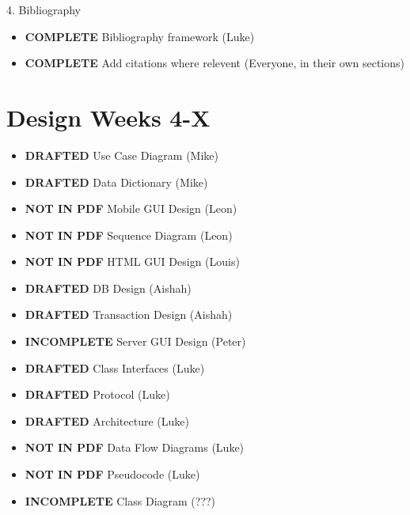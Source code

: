4. Bibliography
\begin{itemize}
\item \textbf{COMPLETE} Bibliography framework (Luke)
\item \textbf{COMPLETE} Add citations where relevent (Everyone, in their own sections)
\end{itemize}

\section{Design \textbf{Weeks 4-X}}
\begin{itemize}
\item \textbf{DRAFTED}       Use Case Diagram (Mike)
\item \textbf{DRAFTED}       Data Dictionary (Mike)
\item \textbf{NOT IN PDF}    Mobile GUI Design (Leon)
\item \textbf{NOT IN PDF}    Sequence Diagram (Leon)
\item \textbf{NOT IN PDF}    HTML GUI Design (Louis)
\item \textbf{DRAFTED}       DB Design (Aishah)
\item \textbf{DRAFTED}       Transaction Design (Aishah)
\item \textbf{INCOMPLETE}    Server GUI Design (Peter)
\item \textbf{DRAFTED}       Class Interfaces (Luke)
\item \textbf{DRAFTED}       Protocol (Luke)
\item \textbf{DRAFTED}       Architecture (Luke)
\item \textbf{NOT IN PDF}    Data Flow Diagrams (Luke)
\item \textbf{NOT IN PDF}    Pseudocode (Luke)
\item \textbf{INCOMPLETE}    Class Diagram (???)
\end{itemize}
